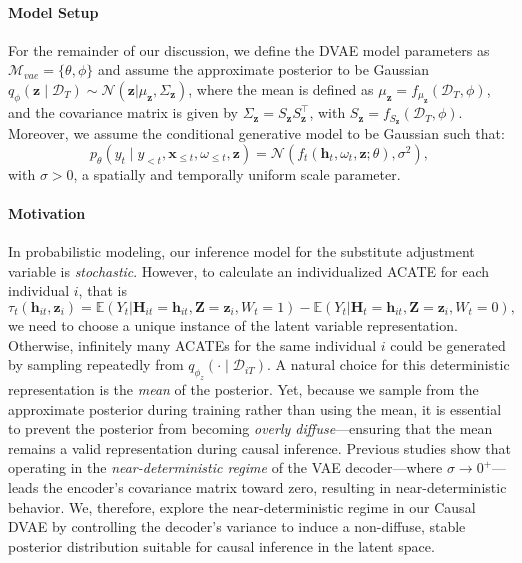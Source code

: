 \documentclass[10pt]{article} %
\begin{document}
\paragraph{Model Setup}  For the remainder of our discussion, we define the DVAE model parameters as $\mathcal{M}_{vae} = \{\theta, \phi\}$ and assume the approximate posterior to be Gaussian \(q_{\phi}(\mathbf{z} \mid \mathcal{D}_T) \sim \mathcal{N}(\mathbf{z}|\mu_{\mathbf{z}}, \Sigma_{\mathbf{z}})\), where the mean is defined as $\mu_{\mathbf{z}}= f_{\mu_{\mathbf{z}}}(\mathcal{D}_T, \phi)$, and the covariance matrix is given by $\Sigma_{\mathbf{z}} = S_{\mathbf{z}}S_{\mathbf{z}}^\top$, with $S_{\mathbf{z}} = f_{S_{\mathbf{z}}}(\mathcal{D}_T, \phi)$.  Moreover, we assume the conditional generative model to be Gaussian such that:
\begin{equation}
\label{eq:proba_yt_gaussian}
p_{\theta}(y_{t} \mid y_{<t}, \mathbf{x}_{\leq t}, \omega_{\leq t}, \mathbf{z}) = \mathcal{N}(f_t(\mathbf{h}_{t}, \omega_t, \mathbf{z}; \theta), \sigma^2),
\end{equation}
with $\sigma > 0$, a spatially and temporally uniform scale parameter.

\paragraph{Motivation} In probabilistic modeling, our inference model for the substitute adjustment variable is \emph{stochastic}. However, to calculate an individualized ACATE for each individual $i$, that is
$$
\tau_{t}(\mathbf{h}_{it}, \mathbf{z}_i) = \mathbb{E}(Y_{t}| \mathbf{H}_{it} = \mathbf{h}_{it}, \mathbf{Z}= \mathbf{z}_i, W_{t} = 1) - \mathbb{E}(Y_{t}| \mathbf{H}_{t} = \mathbf{h}_{it}, \mathbf{Z}= \mathbf{z}_i, W_{t} = 0), 
$$
we need to choose a unique instance of the latent variable representation. Otherwise, infinitely many ACATEs for the same individual $i$ could be generated by sampling repeatedly from \(q_{\phi_z}(\cdot \mid \mathcal{D}_{iT})\). A natural choice for this deterministic representation is the \emph{mean} of the posterior. Yet, because we sample from the approximate posterior during training rather than using the mean, it is essential to prevent the posterior from becoming \emph{overly diffuse}—ensuring that the mean remains a valid representation during causal inference. Previous studies \citep{dai2018diagnosingvae, takida2022preventingoversmoothing} show that operating in the \emph{near-deterministic regime} of the VAE decoder—where $\sigma \to 0^+$—leads the encoder’s covariance matrix toward zero, resulting in near-deterministic behavior. We, therefore, explore the near-deterministic regime in our Causal DVAE by controlling the decoder’s variance to induce a non-diffuse, stable posterior distribution suitable for causal inference in the latent space.
 
\end{document}
